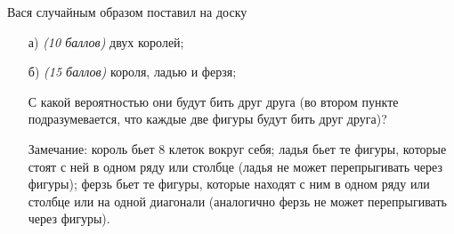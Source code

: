 
Вася случайным образом поставил на доску 

\begin{enumerate}
	\item[а)] \textit{(10 баллов)} двух королей;
	\item[б)] \textit{(15 баллов)} короля, ладью и ферзя;
	
	С какой вероятностью они будут бить друг друга (во втором пункте 
	подразумевается, что каждые две фигуры будут бить друг друга)?
	
	Замечание: король бьет $8$ клеток вокруг себя; ладья бьет
	те фигуры, которые стоят с ней в одном ряду или столбце
	(ладья не может перепрыгивать через фигуры); ферзь бьет
	те фигуры, которые находят с ним в одном ряду или столбце 
	или на одной диагонали (аналогично ферзь не может 
    перепрыгивать через фигуры).
    
\end{enumerate}